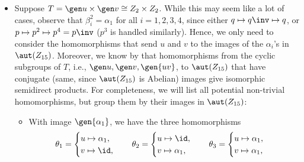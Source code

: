 \begin{solenum}[spsol]
\begin{itemize}
\begin{enumerate}
\[            \]
            \item For $G_4 = Z_{15} \semidir_{\phi_4} Z_4$, we have $tpt\inv = p^2$ and $tqt\inv = q$.
	Since $q \in G_4$ is centralized, we have the factorization
            \[
            	G_4 \cong \gen{p, t} \times \gen q \cong F_{20} \times Z_3.
            \]
            \item For $G_5 = Z_{15} \semidir_{\phi_5} Z_4$, we have $tpt\inv = p^2$ and $tqt\inv = q\inv$.
	Then
            \[
            	G_5 \cong \set{p, q, t \mid p^5 = q^3 = t^4 = 1, pq = qp, tpt\inv = p^2, tqt\inv = q\inv} = F_{20} \semidir Z_3.
            \]
        \end{enumerate}
        \item Suppose $T = \gen u \times \gen v \cong Z_2 \times Z_2$.
        While this may seem like a lot of cases, observe that $\beta_i^2 = \alpha_1$ for all $i = 1, 2, 3, 4$, since either $q \mapsto q\inv \mapsto q$, or $p \mapsto p^2 \mapsto p^4 = p\inv$ ($p^3$ is handled similarly).
        Hence, we only need to consider the homomorphisms that send $u$ and $v$ to the images of the $\alpha_i$'s in $\aut(Z_{15})$.
        Moreover, we know by  that homomorphisms from the cyclic subgroups of $T$, i.e., $\gen u, \gen v, \gen{uv}$, to $\aut(Z_{15})$ that have conjugate (same, since $\aut(Z_{15})$ is Abelian) images give isomorphic semidirect products.
        For completeness, we will list all potential non-trivial homomorphisms, but group them by their images in $\aut(Z_{15})$:
        \begin{itemize}
            \item With image $\gen{\alpha_1}$, we have the three homomorphisms
            \[
            	\theta_1 = 
                \begin{cases}
                    u \mapsto \alpha_1, \\
                    v \mapsto \id,
                \end{cases} \quad
                \theta_2 =
                \begin{cases}
                    u \mapsto \id, \\
                    v \mapsto \alpha_1,
                \end{cases} \quad
                \theta_3 =
                \begin{cases}
                    u \mapsto \alpha_1, \\
                    v \mapsto \alpha_1,
                \end{cases}
\]
\end{itemize}
\end{itemize}
\end{solenum}
